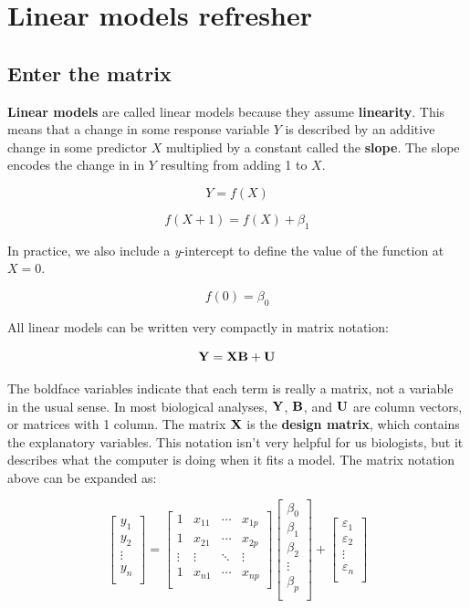 \documentclass[
  13,
  letterpaper,
]{report}
\begin{document}
\section{Linear models refresher}\label{sec-linear-review}

\subsection{Enter the matrix}\label{sec-linear-review-matrix}

\textbf{Linear models} are called linear models because they assume
\textbf{linearity}. This means that a change in some response variable
\(Y\) is described by an additive change in some predictor \(X\)
multiplied by a constant called the \textbf{slope}. The slope encodes
the change in in \(Y\) resulting from adding 1 to \(X\).

\[Y=f\left(X\right)\]

\[f\left(X+1\right)=f\left(X\right)+\beta_1\]

In practice, we also include a \emph{y}-intercept to define the value of
the function at \(X=0\).

\[f\left(0\right)=\beta_0\]

All linear models can be written very compactly in matrix notation:

\[\bf{Y}=\bf{XB}+\bf{U}\]

The boldface variables indicate that each term is really a matrix, not a
variable in the usual sense. In most biological analyses, \(\bf{Y}\),
\(\bf{B}\), and \(\bf{U}\) are column vectors, or matrices with 1
column. The matrix \(\bf{X}\) is the \textbf{design matrix}, which
contains the explanatory variables. This notation isn't very helpful for
us biologists, but it describes what the computer is doing when it fits
a model. The matrix notation above can be expanded as:

\[\left[\begin{matrix}y_1\\y_2\\\vdots\\y_n\\\end{matrix}\right]=\left[\begin{matrix}1&x_{11}&\cdots&x_{1p}\\1&x_{21}&\cdots&x_{2p}\\\vdots&\vdots&\ddots&\vdots\\1&x_{n1}&\cdots&x_{np}\\\end{matrix}\right]\left[\begin{matrix}\beta_0\\\beta_1\\\beta_2\\\vdots\\\beta_p\\\end{matrix}\right]+\left[\begin{matrix}\varepsilon_1\\\varepsilon_2\\\vdots\\\varepsilon_n\\\end{matrix}\right]\]
\end{document}

